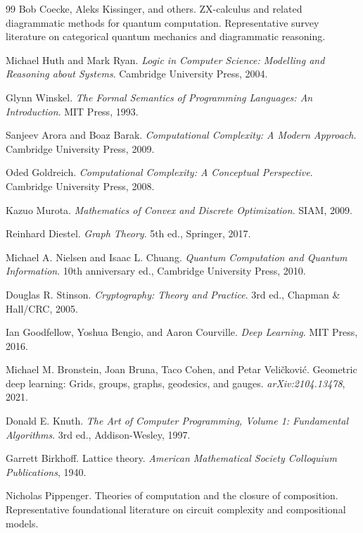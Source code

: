 \documentclass[11pt]{article}
\begin{document}
\begin{thebibliography}{99}
Bob Coecke, Aleks Kissinger, and others.
\newblock ZX-calculus and related diagrammatic methods for quantum computation.
\newblock Representative survey literature on categorical quantum mechanics and diagrammatic reasoning.

Michael Huth and Mark Ryan.
\newblock \emph{Logic in Computer Science: Modelling and Reasoning about Systems}.
\newblock Cambridge University Press, 2004.

Glynn Winskel.
\newblock \emph{The Formal Semantics of Programming Languages: An Introduction}.
\newblock MIT Press, 1993.

Sanjeev Arora and Boaz Barak.
\newblock \emph{Computational Complexity: A Modern Approach}.
\newblock Cambridge University Press, 2009.

Oded Goldreich.
\newblock \emph{Computational Complexity: A Conceptual Perspective}.
\newblock Cambridge University Press, 2008.

Kazuo Murota.
\newblock \emph{Mathematics of Convex and Discrete Optimization}.
\newblock SIAM, 2009.

Reinhard Diestel.
\newblock \emph{Graph Theory}.
\newblock 5th ed., Springer, 2017.

Michael A. Nielsen and Isaac L. Chuang.
\newblock \emph{Quantum Computation and Quantum Information}.
\newblock 10th anniversary ed., Cambridge University Press, 2010.

Douglas R. Stinson.
\newblock \emph{Cryptography: Theory and Practice}.
\newblock 3rd ed., Chapman \& Hall/CRC, 2005.

Ian Goodfellow, Yoshua Bengio, and Aaron Courville.
\newblock \emph{Deep Learning}.
\newblock MIT Press, 2016.

Michael M. Bronstein, Joan Bruna, Taco Cohen, and Petar Veli\v{c}kovi\'c.
\newblock Geometric deep learning: Grids, groups, graphs, geodesics, and gauges.
\newblock \emph{arXiv:2104.13478}, 2021.

Donald E. Knuth.
\newblock \emph{The Art of Computer Programming, Volume 1: Fundamental Algorithms}.
\newblock 3rd ed., Addison-Wesley, 1997.

Garrett Birkhoff.
\newblock Lattice theory.
\newblock \emph{American Mathematical Society Colloquium Publications}, 1940.

Nicholas Pippenger.
\newblock Theories of computation and the closure of composition.
\newblock Representative foundational literature on circuit complexity and compositional models.

\end{thebibliography}
\end{document}
